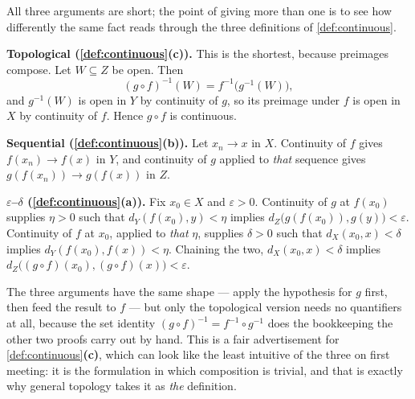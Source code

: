 \begin{exercisesolution}
All three arguments are short; the point of giving more than one is to see how differently the
same fact reads through the three definitions of \cref{def:continuous}.

\textbf{Topological (\cref{def:continuous}\textbf{(c)}).} This is the shortest, because
preimages compose. Let $W \subseteq Z$ be open. Then
\[(g\circ f)^{-1}(W) = f^{-1}\big(g^{-1}(W)\big),\]
and $g^{-1}(W)$ is open in $Y$ by continuity of $g$, so its preimage under $f$ is open in $X$ by
continuity of $f$. Hence $g\circ f$ is continuous.

\textbf{Sequential (\cref{def:continuous}\textbf{(b)}).} Let $x_n \to x$ in $X$. Continuity of
$f$ gives $f(x_n) \to f(x)$ in $Y$, and continuity of $g$ applied to \emph{that} sequence gives
$g(f(x_n)) \to g(f(x))$ in $Z$.

\textbf{$\varepsilon$--$\delta$ (\cref{def:continuous}\textbf{(a)}).} Fix $x_0 \in X$ and
$\varepsilon > 0$. Continuity of $g$ at $f(x_0)$ supplies $\eta > 0$ such that
$d_Y(f(x_0),y) < \eta$ implies $d_Z\big(g(f(x_0)),g(y)\big) < \varepsilon$. Continuity of $f$ at
$x_0$, applied to \emph{that} $\eta$, supplies $\delta > 0$ such that $d_X(x_0,x) < \delta$
implies $d_Y(f(x_0),f(x)) < \eta$. Chaining the two, $d_X(x_0,x) < \delta$ implies
$d_Z\big((g\circ f)(x_0),(g\circ f)(x)\big) < \varepsilon$.

\begin{remark}
The three arguments have the same shape --- apply the hypothesis for $g$ first, then feed the
result to $f$ --- but only the topological version needs no quantifiers at all, because the set
identity $(g\circ f)^{-1} = f^{-1}\circ g^{-1}$ does the bookkeeping the other two proofs carry
out by hand. This is a fair advertisement for \cref{def:continuous}\textbf{(c)}, which can look
like the least intuitive of the three on first meeting: it is the formulation in which
composition is trivial, and that is exactly why general topology takes it as \emph{the}
definition.
\end{remark}
\end{exercisesolution}